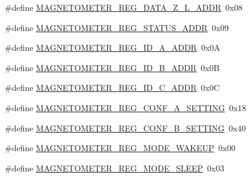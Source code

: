 \begin{DoxyCompactItemize}
\item 
\#define \hyperlink{group___magnetometer_ga5217884064bf55abf7833872dee1f8ae}{M\+A\+G\+N\+E\+T\+O\+M\+E\+T\+E\+R\+\_\+\+R\+E\+G\+\_\+\+D\+A\+T\+A\+\_\+\+Z\+\_\+\+L\+\_\+\+A\+D\+DR}~0x08
\item 
\#define \hyperlink{group___magnetometer_gabe3a5b0475383fb2a6155f3ffb293be5}{M\+A\+G\+N\+E\+T\+O\+M\+E\+T\+E\+R\+\_\+\+R\+E\+G\+\_\+\+S\+T\+A\+T\+U\+S\+\_\+\+A\+D\+DR}~0x09
\item 
\#define \hyperlink{group___magnetometer_gabca452ee0321f9347a20502a6543d633}{M\+A\+G\+N\+E\+T\+O\+M\+E\+T\+E\+R\+\_\+\+R\+E\+G\+\_\+\+I\+D\+\_\+\+A\+\_\+\+A\+D\+DR}~0x0A
\item 
\#define \hyperlink{group___magnetometer_gaf2920a552de3f733f32ce12380d01b59}{M\+A\+G\+N\+E\+T\+O\+M\+E\+T\+E\+R\+\_\+\+R\+E\+G\+\_\+\+I\+D\+\_\+\+B\+\_\+\+A\+D\+DR}~0x0B
\item 
\#define \hyperlink{group___magnetometer_ga1e6aedbbe31b760a7ac8653f82997b98}{M\+A\+G\+N\+E\+T\+O\+M\+E\+T\+E\+R\+\_\+\+R\+E\+G\+\_\+\+I\+D\+\_\+\+C\+\_\+\+A\+D\+DR}~0x0C
\item 
\#define \hyperlink{group___magnetometer_ga191f18f352cc117f9f963d09c4963778}{M\+A\+G\+N\+E\+T\+O\+M\+E\+T\+E\+R\+\_\+\+R\+E\+G\+\_\+\+C\+O\+N\+F\+\_\+\+A\+\_\+\+S\+E\+T\+T\+I\+NG}~0x18
\item 
\#define \hyperlink{group___magnetometer_ga3f4a168d66c4adcd09e312ecacf14555}{M\+A\+G\+N\+E\+T\+O\+M\+E\+T\+E\+R\+\_\+\+R\+E\+G\+\_\+\+C\+O\+N\+F\+\_\+\+B\+\_\+\+S\+E\+T\+T\+I\+NG}~0x40
\item 
\#define \hyperlink{group___magnetometer_gadae52ebace00b6a050bc901005e3fc36}{M\+A\+G\+N\+E\+T\+O\+M\+E\+T\+E\+R\+\_\+\+R\+E\+G\+\_\+\+M\+O\+D\+E\+\_\+\+W\+A\+K\+E\+UP}~0x00
\item 
\#define \hyperlink{group___magnetometer_ga4eb47c9370e041e3ad6708d51ea7d574}{M\+A\+G\+N\+E\+T\+O\+M\+E\+T\+E\+R\+\_\+\+R\+E\+G\+\_\+\+M\+O\+D\+E\+\_\+\+S\+L\+E\+EP}~0x03
\end{DoxyCompactItemize}
